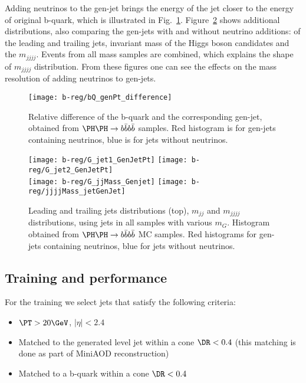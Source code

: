Adding neutrinos to the gen-jet brings the energy of the jet closer to
the energy of original b-quark, which is illustrated in
Fig.~\ref{fig:b-reg-quark}.  Figure~\ref{fig:b-reg-jet-neutrino} shows
additional distributions, also comparing the gen-jets with and without
neutrino additions: \PT of the leading and trailing jets, invariant
mass of the Higgs boson candidates and the $m_{jjjj}$. Events from all
mass samples are combined, which explains the shape of $m_{jjjj}$
distribution. From these figures one can see the effects on the mass
resolution of adding neutrinos to gen-jets.

\begin{figure*}[thb]
  \centering
  \texttt{[image: b-reg/bQ\_genPt\_difference]}\hfil
  \caption{Relative \PT difference of the b-quark and the
    corresponding gen-jet, obtained from $\HH\to\bbbb$ samples. Red
    histogram is for gen-jets containing neutrinos, blue is for jets
    without neutrinos.}
  \label{fig:b-reg-quark}
\end{figure*}


\begin{figure*}[thb]
  \centering
  \texttt{[image: b-reg/G\_jet1\_GenJetPt]}\hfil
  \texttt{[image: b-reg/G\_jet2\_GenJetPt]}\hfil\\
  \texttt{[image: b-reg/G\_jjMass\_Genjet]}\hfil
  \texttt{[image: b-reg/jjjjMass\_jetGenJet]}\hfil
  \caption{Leading and trailing jets \PT distributions (top), $m_{jj}$
    and $m_{jjjj}$ distributions, using jets in all samples with
    various $m_G$. Histogram obtained from $\HH\to\bbbb$ MC samples. Red
    histograms for gen-jets containing neutrinos, blue for jets
    without neutrinos.}
  \label{fig:b-reg-jet-neutrino}
\end{figure*}

\subsection{Training and performance}

For the training we select jets that satisfy the following criteria:
\begin{itemize}
\item $\PT > 20\GeV$, $|\eta| < 2.4$
\item Matched to the generated level jet within a cone $\DR<0.4$ (this matching is done as part of MiniAOD reconstruction)
\item Matched to a b-quark within a cone $\DR<0.4$
\end{itemize}


